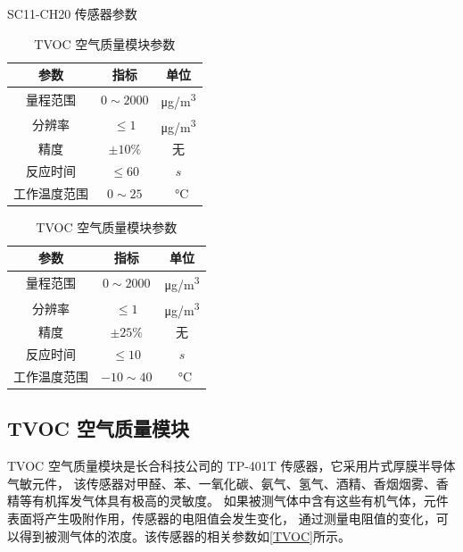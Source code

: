 \documentclass[12pt,hyperref,a4paper,UTF8]{ctexart}
\begin{document}
\begin{table}[htbp]
    \centering
    \begin{minipage}{0.45\textwidth}
        \centering
        \caption{SC11-CH20 传感器参数}
        \begin{tabular}{ccc}
            \toprule
            参数     & 指标             & 单位                  \\ \midrule
            量程范围   & $0\sim 2000 $  & \unit{\ug /m^3}     \\
            分辨率    & $\leqslant 1$  & \unit{\ug /m^3}     \\
            精度     & $\pm 10\%$     & 无                   \\
            反应时间   & $\leqslant 60$ & $s$                 \\
            工作温度范围 & $0 \sim 25$    & \SI{}\degreeCelsius \\
            \bottomrule
        \end{tabular}
        \label{SC11}
    \end{minipage}
    \begin{minipage}{0.45\textwidth}
        \centering
        \caption{TVOC 空气质量模块参数}
        \begin{tabular}{ccc}
            \toprule
            参数     & 指标             & 单位                  \\ \midrule
            量程范围   & $0\sim 2000 $  & \unit{\ug /m^3}     \\
            分辨率    & $\leqslant 1$  & \unit{\ug /m^3}     \\
            精度     & $\pm 25\%$     & 无                   \\
            反应时间   & $\leqslant 10$ & $s$                 \\
            工作温度范围 & $-10 \sim 40$  & \SI{}\degreeCelsius \\
            \bottomrule
        \end{tabular}
        \label{TVOC}
    \end{minipage}
\end{table}

\subsection{TVOC 空气质量模块}
TVOC 空气质量模块是长合科技公司的 TP-401T 传感器，它采用片式厚膜半导体气敏元件，
该传感器对甲醛、苯、一氧化碳、氨气、氢气、酒精、香烟烟雾、香精等有机挥发气体具有极高的灵敏度。
如果被测气体中含有这些有机气体，元件表面将产生吸附作用，传感器的电阻值会发生变化，
通过测量电阻值的变化，可以得到被测气体的浓度。该传感器的相关参数如\autoref{TVOC}所示。
\end{document}
